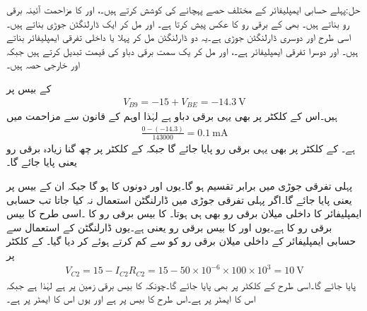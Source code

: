 حل:پہلے حسابی ایمپلیفائر کے مختلف حصے پہچانے کی کوشش کرتے ہیں۔،  اور  کا مزاحمت آئینہ برقی رو بناتے ہیں۔ بھی  کے برقی رو کا عکس پیش کرتا ہے۔ اور  مل کر ایک ڈارلنگٹن جوڑی بناتے ہیں۔اسی طرح  اور  دوسری ڈارلنگٹن جوڑی ہے۔یہ دو ڈارلنگٹن مل کر پہلا یا داخلی تفرقی ایمپلیفائر بناتے ہیں۔ اور  دوسرا تفرقی ایمپلیفائر ہے۔،  اور  مل کر یک سمت برقی دباو  کی قیمت تبدیل کرتے ہیں جبکہ  اور  خارجی حصہ ہیں۔

 کے بیس پر
\begin{align*}
V_{B9}=-15+V_{BE}=\SI{-14.3}{\volt}
\end{align*}
ہیں۔اس کے کلکٹر پر بھی یہی برقی دباو ہے لہٰذا اوہم کے قانون سے  مزاحمت میں
\begin{align*}
\frac{0-(-14.3)}{143000}=\SI{0.1}{\milli \ampere}
\end{align*}
ہے۔ کے کلکٹر پر بھی یہی برقی رو پایا جائے گا جبکہ  کے کلکٹر پر چھ گنا زیادہ برقی رو یعنی  پایا جائے گا۔

پہلی تفرقی جوڑی میں   برابر تقسیم ہو گا۔یوں  اور  دونوں کا  ہو گا جبکہ ان کے بیس پر  یعنی  پایا جائے گا۔اگر پہلی تفرقی جوڑی میں ڈارلنگٹن استعمال نہ کیا جاتا تب حسابی ایمپلیفائر کا داخلی میلان برقی رو بھی  ہی ہوتا۔ کا بیس برقی رو  کا ۔اسی طرح  کا بیس برقی رو  کا  ہے۔یوں  اور  کا بیس برقی رو  یعنی  ہے۔یوں ڈارلنگٹن کے استعمال سے حسابی ایمپلیفائر کے داخلی میلان برقی رو کو  سے کم کرتے ہوئے  کر دیا گیا۔ کے کلکٹر پر
\begin{align*}
V_{C2}=15-I_{C2} R_{C2}=15 - 50 \times 10^{-6} \times 100 \times 10^{3}=\SI{10}{\volt}
\end{align*}   
پایا جائے گا۔اسی طرح  کے کلکٹر پر بھی  پایا جائے گا۔چونکہ  کا بیس برقی زمین پر ہے لہٰذا  ہے جبکہ اس کا ایمٹر  پر ہے۔اس طرح  کا بیس  پر ہے اور یوں اس کا ایمٹر  پر ہے۔


